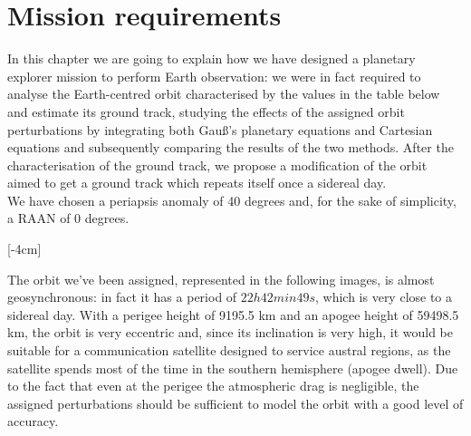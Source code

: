 \documentclass[11pt,a4paper]{report}
\begin{document}
\chapter{Mission requirements}
In this chapter we are going to explain how we have designed a planetary explorer
mission to perform Earth observation: we were in fact required to analyse the Earth-centred orbit characterised by the values in the table below and estimate its ground track, studying the effects of the assigned orbit perturbations by integrating both Gauß’s planetary equations and Cartesian equations and subsequently comparing the results of the two methods. After the characterisation of the ground track, we propose a modification of the orbit aimed to get a ground track which repeats itself once a sidereal day.\\
We have chosen a periapsis anomaly of 40 degrees and, for the sake of simplicity, a RAAN of 0 degrees.

\begin{table}[H]
\centering
{}
\caption{Mission requirements}
\label{tab:Mission_requirements}
\end{table}

[-4cm]

The orbit we've been assigned, represented in the following images, is almost geosynchronous: in fact it has a period of $22h 42 min 49s$, which is very close to a sidereal day. With a perigee height of 9195.5 km and an apogee height of 59498.5 km, the orbit is very eccentric and, since its inclination is very high, it would be suitable for a communication satellite designed to service austral regions, as the satellite spends most of the time in the southern hemisphere (apogee dwell).  
Due to the fact that even at the perigee the atmospheric drag is negligible, the assigned perturbations should be sufficient to model the orbit with a good level of accuracy.
\end{document}
